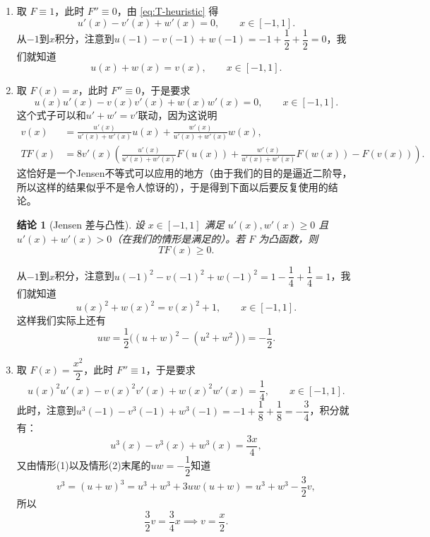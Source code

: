 \documentclass[UTF8,fontset=windows,a4paper,11pt]{ctexart}
\newtheorem{claim}{结论}
\begin{document}
\begin{enumerate}
    \item[\textbf{情形 (1).}] 取 $F\equiv1$，此时 $F''\equiv0$，由 \eqref{eq:T-heuristic} 得
    \begin{equation}
        u'(x)-v'(x)+w'(x)=0,\qquad x\in[-1,1].
        \label{eq:moment-0}
    \end{equation}
    从$-1$到$x$积分，注意到$u(-1)-v(-1)+w(-1)=-1+\dfrac{1}{2}+\dfrac{1}{2}=0$，我们就知道
    \begin{equation}
        u(x)+w(x)=v(x),\qquad x\in[-1,1].
        \label{eq:coe-0}
    \end{equation}
    \item[\textbf{情形 (2).}] 取 $F(x)=x$，此时 $F''\equiv0$，于是要求
    \begin{equation}
        u(x)u'(x)-v(x)v'(x)+w(x)w'(x)=0,\qquad x\in[-1,1].
        \label{eq:moment-1}
    \end{equation}
    这个式子可以和$u'+w'=v'$联动，因为这说明
    \begin{align*}
        v(x)&=\frac{u'(x)}{u'(x)+w'(x)}u(x)+\frac{w'(x)}{u'(x)+w'(x)}w(x),\\
        TF(x)&=8v'(x)\left(\frac{u'(x)}{u'(x)+w'(x)}F(u(x))+\frac{w'(x)}{u'(x)+w'(x)}F(w(x))-F(v(x))\right).
    \end{align*}
    这恰好是一个Jensen不等式可以应用的地方（由于我们的目的是逼近二阶导，所以这样的结果似乎不是令人惊讶的），于是得到下面以后要反复使用的结论。

    \begin{claim}[Jensen 差与凸性]
    \label{clm:convex}
        设 $x\in[-1,1]$ 满足 $u'(x),w'(x)\ge0$ 且 $u'(x)+w'(x)>0$（在我们的情形是满足的）。若 $F$ 为凸函数，则
        \[
            TF(x)\ge0.
        \]
    \end{claim}
    从$-1$到$x$积分，注意到$u(-1)^2-v(-1)^2+w(-1)^2=1-\dfrac{1}{4}+\dfrac{1}{4}=1$，我们就知道
    \begin{equation}
        u(x)^2+w(x)^2=v(x)^2+1,\qquad x\in[-1,1].
        \label{eq:coe-1}
    \end{equation}
    这样我们实际上还有
    \[
        uw=\frac{1}{2}\bigl((u+w)^2-(u^2+w^2)\bigr)=-\frac{1}{2}.
    \]
    \item[\textbf{情形 (3).}] 取 $F(x)=\dfrac{x^{2}}{2}$，此时 $F''\equiv1$，于是要求
    \begin{equation}
        u(x)^{2}u'(x)-v(x)^{2}v'(x)+w(x)^{2}w'(x)=\dfrac{1}{4},\qquad x\in[-1,1].
        \label{eq:moment-2}
    \end{equation}
    此时，注意到$u^3(-1)-v^3(-1)+w^3(-1)=-1+\dfrac{1}{8}+\dfrac{1}{8}=-\dfrac{3}{4}$，积分就有：
    \[
    u^3(x)-v^3(x)+w^3(x)=\frac{3x}{4},
    \]
    又由情形(1)以及情形(2)末尾的$uw=-\dfrac{1}{2}$知道
    \[
        v^3=(u+w)^3=u^3+w^3+3uw(u+w)=u^3+w^3-\frac{3}{2}v,
    \]
    所以
    \[
        \frac{3}{2}v=\frac{3}{4}x\implies v=\frac{x}{2}.
    \]
\end{enumerate}
\end{document}
